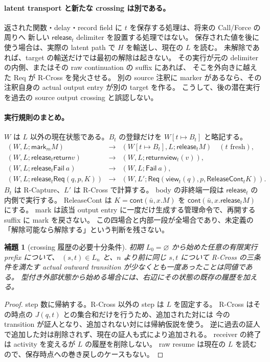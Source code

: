 \documentclass[11pt,a4paper]{article}
\newtheorem{lemma}[definition]{補題}
\newcommand{\Ret}{\mathsf{return}}
\newcommand{\Req}{\mathsf{Req}}
\begin{document}
\paragraph{latent transport と新たな crossing は別である。}
返された関数・delay・record field に \(t\) を保存する処理は、将来の Call/Force の周りへ
新しい \(\mathsf{release}_t\) delimiter を設置する処理ではない。
保存された値を後に使う場合は、実際の latent path で \(H\) を輸送し、現在の \(L\) を読む。
未解除であれば、target の輸送だけでは最初の解除は起きない。
その実行が元の delimiter の内側、またはその raw continuation の suffix にあれば、
そこを外向きに越えた Req が R-Cross を発火させる。
別の source 注釈に marker があるなら、その注釈自身の actual output entry が別の target を作る。
こうして、後の潜在実行を過去の source output crossing と誤認しない。

\paragraph{実行規則のまとめ。}
\(W\) は \(L\) 以外の現在状態である。\(B_t\) の登録だけを \(W[t\mapsto B_t]\) と略記する。
\[
\begin{array}{rcl}
 (W,L;\mathsf{mark}_m M)&\longrightarrow&
 (W[t\mapsto B_t],L;\mathsf{release}_t M)\quad(t\text{ fresh}),\\
 (W,L;\mathsf{release}_t\Ret v)&\longrightarrow&
 (W,L;\Ret\mathsf{view}_t(v)),\\
 (W,L;\mathsf{release}_t\mathsf{Fail}\ a)&\longrightarrow&
 (W,L;\mathsf{Fail}\ a),\\
 (W,L;\mathsf{release}_t\Req(q,p,K))&\longrightarrow&
 (W,L';\Req(\mathsf{view}_t(q),p,\mathsf{ReleaseCont}_t K)).
\end{array}
\tag{R-Step}
\]
\(B_t\) は R-Capture、\(L'\) は R-Cross で計算する。
body の非終端一段は \(\mathsf{release}_t\) の内側で実行する。
ReleaseCont は \(K=\mathsf{cont}(\bar u,x.M)\) を
\(\mathsf{cont}(\bar u,x.\mathsf{release}_t M)\) にする。
mark は該当 output entry に一度だけ生成する管理命令で、再開する suffix に mark を戻さない。
この四場合と内部一段が全場合であり、未定義の「解除可能なら解除する」という判断を残さない。

\begin{lemma}[crossing 履歴の必要十分条件]
\label{lem:release-history}
初期 \(L_0=\varnothing\) から始めた任意の有限実行 prefix について、
\((s,t)\in L_n\) と、\(n\) より前に同じ \(s,t\) について R-Cross の三条件を満たす
actual outward transition が少なくとも一度あったことは同値である。
型付き外部状態から始める場合には、右辺にその状態の既存の履歴を加える。
\end{lemma}
\begin{proof}
step 数に帰納する。R-Cross 以外の step は \(L\) を固定する。
R-Cross はその時点の \(J(q,t)\) との集合和だけを行うため、追加された対には
今の transition が証人となり、追加されない対には帰納仮説を使う。
逆に過去の証人で追加した対は削除されず、現在の証人も式により追加される。
receiver の終了は activity を変えるが \(L\) の履歴を削除しない。
raw resume は現在の \(L\) を読むので、保存時点への巻き戻しのケースもない。
\end{proof}
\end{document}
